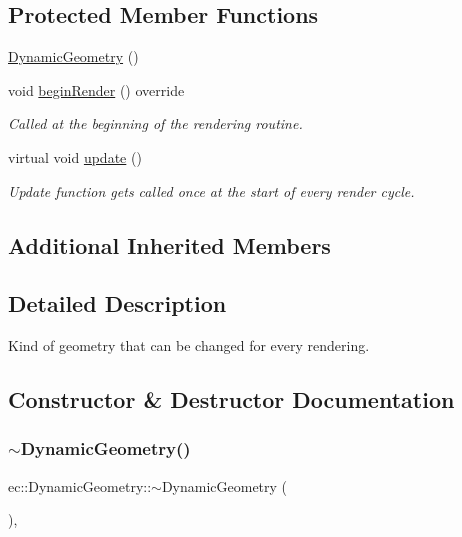 \subsection*{Protected Member Functions}
\begin{DoxyCompactItemize}
\item 
\mbox{\hyperlink{classec_1_1_dynamic_geometry_a4b0b6439b7c04f652eb74305abfe3bb9}{Dynamic\+Geometry}} ()
\item 
void \mbox{\hyperlink{classec_1_1_dynamic_geometry_ae4eb49e852a4c300325a288bf9ea4408}{begin\+Render}} () override
\begin{DoxyCompactList}\small\item\em Called at the beginning of the rendering routine. \end{DoxyCompactList}\item 
virtual void \mbox{\hyperlink{classec_1_1_dynamic_geometry_a76ddfd59d22b89ada5af4fc57e118dee}{update}} ()
\begin{DoxyCompactList}\small\item\em Update function gets called once at the start of every render cycle. \end{DoxyCompactList}\end{DoxyCompactItemize}
\subsection*{Additional Inherited Members}


\subsection{Detailed Description}
Kind of geometry that can be changed for every rendering. 

\subsection{Constructor \& Destructor Documentation}
\mbox{\label{classec_1_1_dynamic_geometry_aeed5b7ffd9876f086207dbaf7e5bc6fc}} 
\subsubsection{\texorpdfstring{$\sim$\+Dynamic\+Geometry()}{~DynamicGeometry()}}
{\footnotesize\ttfamily ec\+::\+Dynamic\+Geometry\+::$\sim$\+Dynamic\+Geometry (\begin{DoxyParamCaption}{ }\end{DoxyParamCaption})\hspace{0.3cm}{\ttfamily [virtual]}, {\ttfamily [default]}}

